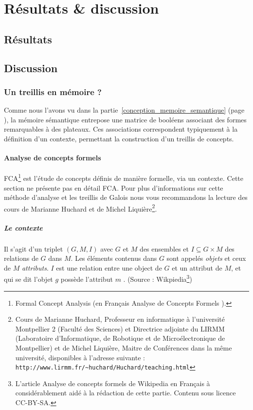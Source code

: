 \clearemptydoublepage
\chapter{Résultats \&  discussion}

\section{Résultats}



\section{Discussion}
\subsection{Un treillis en mémoire ?}
Comme nous l'avons vu dans la partie~\ref{conception_memoire_semantique} (page \pageref{conception_memoire_semantique}), la mémoire sémantique entrepose une matrice de booléens associant des formes remarquables à des plateaux. Ces associations correspondent typiquement à la définition d'un contexte, permettant la construction d'un treillis de concepts.

\subsubsection{Analyse de concepts formels}
FCA\footnote{Formal Concept Analysis (en Français \og Analyse de Concepts Formels \fg{}).} est l'étude de concepts définis de manière formelle, via un contexte. Cette section ne présente pas en détail FCA. Pour plus d'informations sur cette méthode d'analyse et les treillis de Galois nous vous recommandons la lecture des cours de Marianne Huchard et de Michel Liquière\footnote{Cours de Marianne Huchard, Professeur en informatique à l'université Montpellier 2 (Faculté des Sciences) et Directrice adjointe du LIRMM (Laboratoire d'Informatique, de Robotique et de Microélectronique de Montpellier) et de Michel Liquière, Maitre de Conférences dans la même université, disponibles à l'adresse suivante : \texttt{http://www.lirmm.fr/\textasciitilde huchard/Huchard/teaching.html}}.

\paragraph{Le contexte} Il s'agit d'un triplet $(G,M,I)$ avec $G$ et $M$ des ensembles et $I\subseteq G \times M$ des relations de $G$ dans $M$. Les éléments contenus dans $G$ sont appelés \emph{objets} et ceux de $M$ \emph{attributs}. $I$ est une relation entre une object de $G$ et un attribut de $M$, et qui se dit \og l'objet $g$ possède l'attribut $m$ \fg{}. (Source : Wikpiedia\footnote{L'article \og Analyse de concepts formels \fg{} de Wikipedia en Français à considérablement aidé à la rédaction de cette partie. Contenu sous licence CC-BY-SA.})

